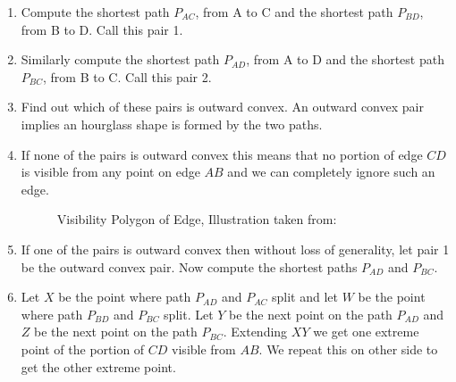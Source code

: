 \begin{enumerate}
\item
Compute the shortest path $P_{AC}$, from A to C and the shortest path $P_{BD}$, from B to D. Call this pair 1.
\item
Similarly compute the shortest path  $P_{AD}$, from A to D and the shortest path  $P_{BC}$,  from B to C. Call this pair 2.
\item
Find out which of these pairs is outward convex. An outward convex pair implies an hourglass shape is formed by the two paths.
\item
If none of the pairs is outward convex this means that no portion of edge $CD$ is visible from any point on edge $AB$ and we can 
completely ignore such an edge.

\begin{figure}[h]
\begin{center}
\caption{\label{fig:Visibility Polygon of Edge}Visibility Polygon of Edge, Illustration taken from:\cite{key3}}
\end{center}
\end{figure}

\item
If one of the pairs is outward convex then without loss of generality, let pair 1 be the outward convex pair. Now compute the shortest 
paths  $P_{AD}$ and  $P_{BC}$.

\item
Let $X$ be the point where path $P_{AD}$ and $P_{AC}$ split and let  $W$ be the point where path $P_{BD}$ and $P_{BC}$ split. Let $Y$ be
the next point on the path  $P_{AD}$ and $Z$ be the next point on the path   $P_{BC}$. Extending $XY$ we get one extreme point of the 
portion of $CD$ visible from $AB$. We repeat this on other side to get the other extreme point.


\end{enumerate}

